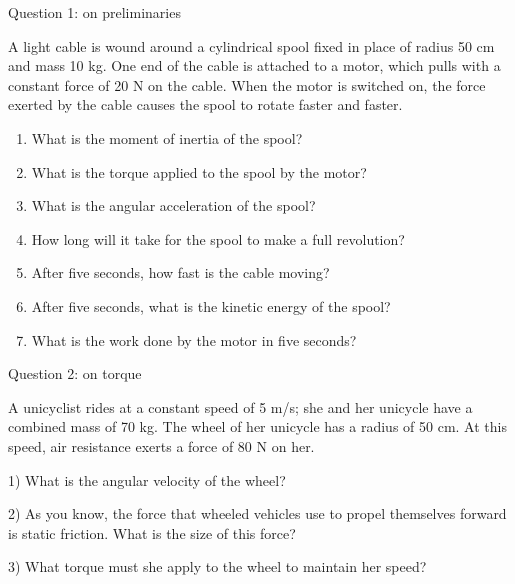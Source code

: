 \documentclass[12pt]{article}
\begin{document}
\Large
\centerline{}
\normalsize
\centerline{}

\centerline{\large Question 1: on preliminaries}

\vspace{1in}

  A light cable is wound around a cylindrical spool fixed in place of radius 50 cm and mass 10 kg. One end of the cable is attached to a motor, which pulls with a constant force of 20 N on the cable. When the motor is switched on, the force exerted by the cable causes the spool to rotate faster and faster.
\begin{enumerate}
      \item{What is the moment of inertia of the spool?}
\vspace{0.7in}
      \item{What is the torque applied to the spool by the motor?}
\vspace{0.7in}
      \item{What is the angular acceleration of the spool?}
\vspace{0.7in}
      \item{How long will it take for the spool to make a full revolution?}
\vspace{0.7in}
      \item{After five seconds, how fast is the cable moving?}
\vspace{0.7in}
      \item{After five seconds, what is the kinetic energy of the spool?}
\vspace{0.7in}
      \item{What is the work done by the motor in five seconds?}
     \end{enumerate}
\newpage

\centerline{\large Question 2: on torque}

 A unicyclist rides at a constant speed of 5 m/s; she and her unicycle have a combined mass of 70 kg. The wheel of her unicycle has a radius of 50 cm. At this speed, air resistance exerts a force of 80 N on her.


       1) What is the angular velocity of the wheel?
\vspace{1.2in}

       2) As you know, the force that wheeled vehicles use to propel themselves forward is static friction. What is the size of this force?
\vspace {1.2in}

       3) What torque must she apply to the wheel to maintain her speed?
\vspace{2in}
\end{document}
